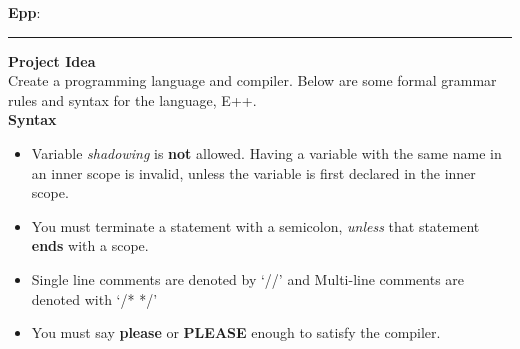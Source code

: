 \documentclass[11pt]{article}
\newcommand{\hwheadings}[3]{
{{\bf Epp}: \chapsec } \hfill {{ \yourname }} \hfill {{ \course #1}}
\rule[0.051in]{\textwidth}{0.0025in}
}
\begin{document}
\hwheadings{}{}{}

\textbf{Project Idea} \\
Create a programming language and compiler. Below are some formal grammar rules 
and syntax for the language, E++. \\

\textbf{Syntax}
\begin{itemize}
  \item Variable \textit{shadowing} is \textbf{not} allowed. Having a variable with the same name 
    in an inner scope is invalid, unless the variable is first 
    declared in the inner scope. 
  \item You must terminate a statement with a semicolon, \textit{unless} that 
    statement \textbf{ends} with a scope. 
  \item Single line comments are denoted by `//' and Multi-line comments are denoted with `/* */'
  \item You must say \textbf{please} or \textbf{PLEASE} enough to satisfy the compiler.
\end{itemize}
\end{document}
